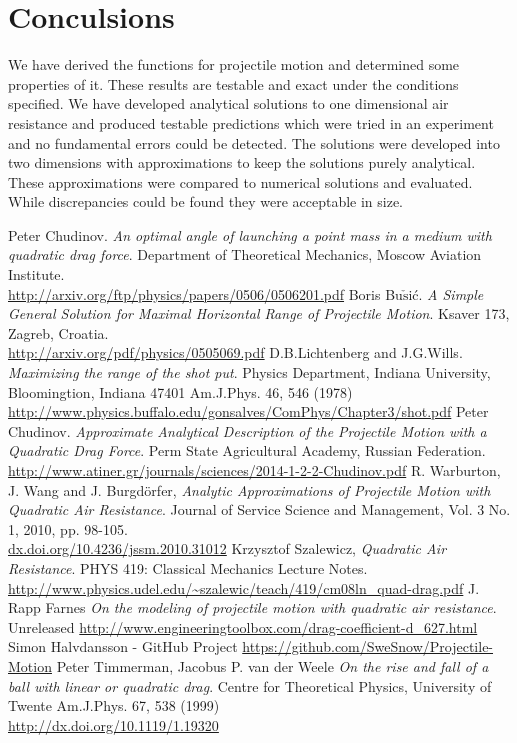 \documentclass[%
aip,
jmp,
amsmath,amssymb,
reprint,%
]{revtex4-1}
\begin{document}
	\section{Conculsions}
	We have derived the functions for projectile motion and determined some properties of it. These results are testable and exact under the conditions specified. We have developed analytical solutions to one dimensional air resistance and produced testable predictions which were tried in an experiment and no fundamental errors could be detected. The solutions were developed into two dimensions with approximations to keep the solutions purely analytical. These approximations were compared to numerical solutions and evaluated. While discrepancies could be found they were acceptable in size.
	\begin{thebibliography}{7}
		Peter Chudinov. \textit{An optimal angle of launching a point mass in a medium with quadratic drag force}.
		Department of Theoretical Mechanics, Moscow Aviation Institute.
		\\\url{http://arxiv.org/ftp/physics/papers/0506/0506201.pdf}
		Boris Bu$\check{\mathrm{s}}$i\'{c}. \textit{A Simple General Solution for Maximal Horizontal Range of Projectile Motion}.
		Ksaver 173, Zagreb, Croatia.
		\\\url{http://arxiv.org/pdf/physics/0505069.pdf}
		D.B.Lichtenberg and J.G.Wills. \textit{Maximizing the range of the shot put}.
		Physics Department, Indiana University, Bloomingtion, Indiana 47401
		Am.J.Phys. 46, 546 (1978)
		\\\url{http://www.physics.buffalo.edu/gonsalves/ComPhys/Chapter3/shot.pdf}
		Peter Chudinov. \textit{Approximate Analytical Description of the Projectile Motion with a Quadratic Drag Force}.
		Perm State Agricultural Academy, Russian Federation.
		\\\url{http://www.atiner.gr/journals/sciences/2014-1-2-2-Chudinov.pdf}
		R. Warburton, J. Wang and J. Burgdörfer, \textit{Analytic Approximations of Projectile Motion with Quadratic Air Resistance}.
		Journal of Service Science and Management, Vol. 3 No. 1, 2010, pp. 98-105. \\\url{dx.doi.org/10.4236/jssm.2010.31012}
		Krzysztof Szalewicz, \textit{Quadratic Air Resistance}.
		PHYS 419: Classical Mechanics Lecture Notes.
		\\\url{http://www.physics.udel.edu/~szalewic/teach/419/cm08ln_quad-drag.pdf}
		J. Rapp Farnes \textit{On the modeling of projectile motion with quadratic air resistance}.
		Unreleased
		\url{http://www.engineeringtoolbox.com/drag-coefficient-d_627.html}
		Simon Halvdansson - GitHub Project
		\url{https://github.com/SweSnow/Projectile-Motion}
		Peter Timmerman, Jacobus P. van der Weele \textit{On the rise and fall of a ball with linear or quadratic drag}.
		Centre for Theoretical Physics, University of Twente
		Am.J.Phys. 67, 538 (1999)
		\\\url{http://dx.doi.org/10.1119/1.19320}
	\end{thebibliography}
\end{document}
